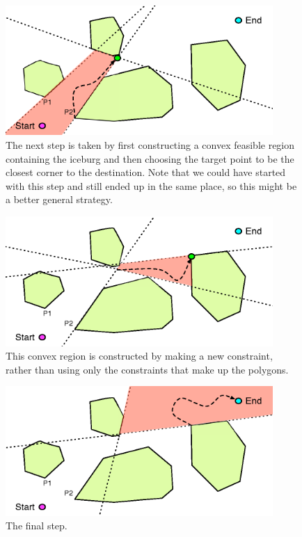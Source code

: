 \documentclass[12pt]{article}
\begin{document}
\begin{figure}[h]
\centering
\includegraphics[width=4in]{step2}
\caption{The next step is taken by first constructing a convex feasible region containing the iceburg and then
choosing the target point to be the closest corner to the destination. Note that we could have started with this
step and still ended up in the same place, so this might be a better general strategy.}
\label{fig:step2}
\end{figure}

\begin{figure}[h]
\centering
\includegraphics[width=4in]{step3}
\caption{This convex region is constructed by making a new constraint, rather than using only the constraints that make
up the polygons.}
\label{fig:step3}
\end{figure}


\begin{figure}[h]
\centering
\includegraphics[width=4in]{step4}
\caption{The final step.}
\label{fig:step4}
\end{figure}
\end{document}
